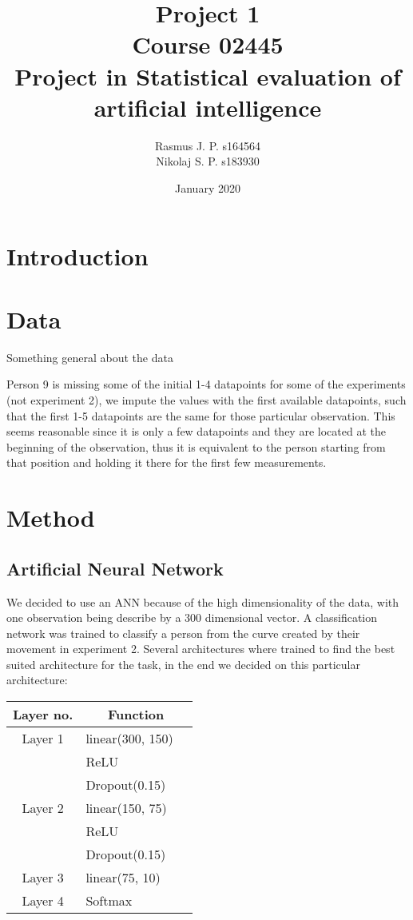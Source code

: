 \documentclass{article}
\begin{document}
\begin{titlepage}
	
	
	\title{Project 1 \\ Course 02445 \\ Project in Statistical evaluation of \\ artificial intelligence }
	\author{Rasmus J. P. s164564 \\ Nikolaj S. P. s183930}
	\date{January 2020}
	\maketitle
\end{titlepage}

\section{Introduction}


\section{Data}
Something general about the data

Person 9 is missing some of the initial 1-4 datapoints for some of the experiments (not experiment 2), 
we impute the values with the first available datapoints, such that the first 1-5 datapoints are the same for those particular observation. This seems reasonable since it is only a few datapoints and they are located at the beginning of the observation, thus it is equivalent to the person starting from that position and holding it there for the first few measurements.

\section{Method}
\subsection{Artificial Neural Network}
We decided to use an ANN because of the high dimensionality of the data, with one observation being describe by a 300 dimensional vector.
A classification network was trained to classify a person from the curve created by their movement in experiment 2. Several architectures where trained to find the best suited architecture for the task, in the end we decided on this particular architecture:

\begin{tabular}[H]{c l @{} l}
\centering
Layer no.       &
\multicolumn{2}{c}{Function} \\
\hline
Layer 1     & linear(300, 150) \\
            & ReLU \\
            & Dropout(0.15) \\
Layer 2     & linear(150, 75) \\ 
            & ReLU \\
            & Dropout(0.15) \\
Layer 3     & linear(75, 10) \\ 
Layer 4     & Softmax\\ 
\end{tabular}\\ 
\end{document}
